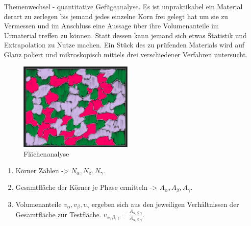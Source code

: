 Themenwechsel - quantitative Gefügeanalyse. Es ist unpraktikabel ein Material derart zu zerlegen bis jemand jedes einzelne
Korn frei gelegt hat um sie zu Vermessen und im Anschluss eine Aussage über ihre Volumenanteile im Urmaterial treffen zu
können. Statt dessen kann jemand sich etwas Statistik und Extrapolation zu Nutze machen. Ein Stück des zu prüfenden Materials
wird auf Glanz poliert und mikroskopisch mittels drei verschiedener Verfahren untersucht.
\newpage
\begin{figure}[h]
    \centering
    \includegraphics[width=0.5\textwidth]{entries/6/flaechen.jpg}
    \caption{Flächenanalyse}
    \label{fig:flaechen}
\end{figure}
\begin{enumerate}
    \item Körner Zählen -> \(N_{\alpha}, N_{\beta}, N_{\gamma}\).
    \item Gesamtfläche der Körner je Phase ermitteln -> \(A_{\alpha}, A_{\beta}, A_{\gamma}\).
    \item Volumenanteile \(v_{\alpha}, v_{\beta}, v_{\gamma}\) ergeben sich aus den jeweiligen Verhältnissen der Gesamtfläche zur Testfläche.
    \(v_{\alpha,\beta,\gamma} = \frac{A_{\alpha,\beta,\gamma}}{A_{\alpha,\beta,\gamma}}\).
\end{enumerate}

